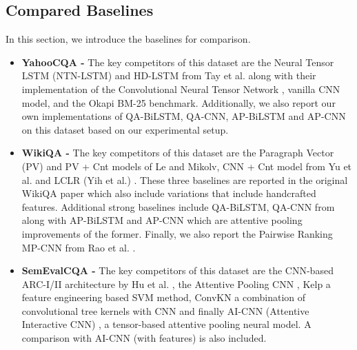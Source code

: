 \documentclass[sigconf]{acmart}
\begin{document}
\subsection{Compared Baselines}

In this section, we introduce the baselines for comparison. 

\begin{itemize}


\item \textbf{YahooCQA -}
The key competitors of this dataset are the Neural Tensor LSTM (NTN-LSTM) and HD-LSTM from Tay et al. \cite{DBLP:conf/sigir/TayPLH17} along with their implementation of the Convolutional Neural Tensor Network \cite{DBLP:conf/ijcai/QiuH15}, vanilla CNN model, and the Okapi BM-25 \cite{DBLP:conf/trec/RobertsonWJHG94} benchmark. Additionally, we also report our own implementations of QA-BiLSTM, QA-CNN, AP-BiLSTM and AP-CNN on this dataset based on our experimental setup.

\item \textbf{WikiQA -}
The key competitors of this dataset are the Paragraph Vector (PV) and PV + Cnt models \cite{le2014distributed} of Le and Mikolv, CNN + Cnt model from Yu et al. \cite{DBLP:journals/corr/YuHBP14} and LCLR (Yih et al.) \cite{DBLP:conf/acl/YihCMP13}. These three baselines are reported in the original WikiQA paper \cite{DBLP:conf/emnlp/YangYM15} which also include variations that include handcrafted features. Additional strong baselines include QA-BiLSTM, QA-CNN from \cite{DBLP:journals/corr/SantosTXZ16} along with AP-BiLSTM and AP-CNN which are attentive pooling improvements of the former. Finally, we also report the Pairwise Ranking MP-CNN from Rao et al. \cite{DBLP:conf/cikm/RaoHL16}.

\item \textbf{SemEvalCQA -}
The key competitors of this dataset are the CNN-based ARC-I/II architecture by Hu et al. \cite{DBLP:conf/nips/HuLLC14}, the Attentive Pooling CNN \cite{DBLP:journals/corr/SantosTXZ16}, Kelp \cite{DBLP:conf/semeval/FiliceCMB16} a feature engineering based SVM method, ConvKN \cite{DBLP:conf/semeval/Barron-CedenoMJ16} a combination of convolutional tree kernels with CNN and finally  AI-CNN (Attentive Interactive CNN) \cite{DBLP:conf/aaai/ZhangLSW17}, a tensor-based attentive pooling neural model. A comparison with AI-CNN (with features) is also included. 


\end{itemize}
\end{document}
